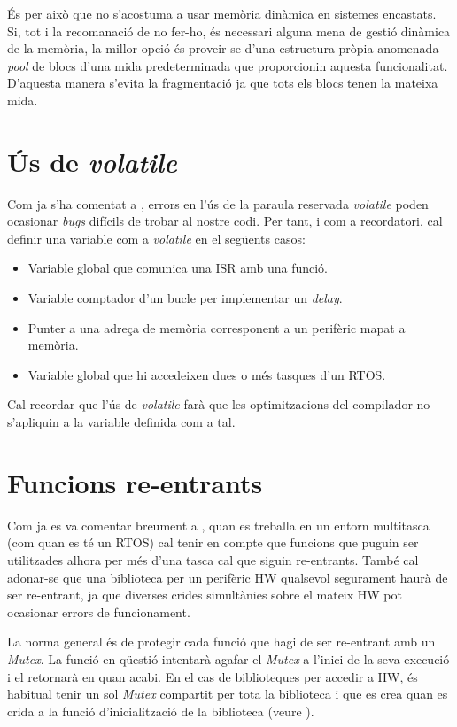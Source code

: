 És per això que no s'acostuma a usar memòria dinàmica en sistemes encastats. Si, tot i la recomanació de no fer-ho, és necessari alguna mena de gestió dinàmica de la memòria, la millor opció és proveir-se d'una estructura pròpia {anomenada \em pool} de blocs d'una mida predeterminada que proporcionin aquesta funcionalitat. D'aquesta manera s'evita la fragmentació ja que tots els blocs tenen la mateixa mida.

\section{Ús de {\em volatile}}
Com ja s'ha comentat a , errors en l'ús de la paraula reservada {\em volatile} poden ocasionar {\em bugs} difícils de trobar al nostre codi. Per tant, i com a recordatori, cal definir una variable com a {\em volatile} en el següents casos:
\begin{itemize}
 \item Variable global que comunica una ISR amb una funció.
 \item Variable comptador d'un bucle per implementar un {\em delay}.
 \item Punter a una adreça de memòria corresponent a un perifèric mapat a memòria.
 \item Variable global que hi accedeixen dues o més tasques d'un RTOS.
\end{itemize}

Cal recordar que l'ús de {\em volatile} farà que les optimitzacions del compilador no s'apliquin a la variable definida com a tal.

\section{Funcions re-entrants}
Com ja es va comentar breument a , quan es treballa en un entorn multitasca (com quan es té un RTOS) cal tenir en compte que funcions que puguin ser utilitzades alhora per més d'una tasca cal que siguin re-entrants. També cal adonar-se que una biblioteca per un perifèric HW qualsevol segurament haurà de ser re-entrant, ja que diverses crides simultànies sobre el mateix HW pot ocasionar errors de funcionament.

La norma general és de protegir cada funció que hagi de ser re-entrant amb un {\em Mutex}. La funció en qüestió intentarà agafar el {\em Mutex} a l'inici de la seva execució i el retornarà en quan acabi. En el cas de biblioteques per accedir a HW, és habitual tenir un sol {\em Mutex} compartit per tota la biblioteca i que es crea quan es crida a la funció d'inicialització de la biblioteca (veure ).


